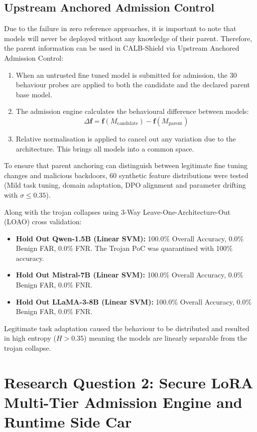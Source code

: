 \documentclass[conference]{IEEEtran}
\begin{document}
\subsection{Upstream Anchored Admission Control}
\label{subsec:rq1_upstream}
Due to the failure in zero reference approaches, it is important to note that models will never be deployed without any knowledge of their parent. Therefore, the parent information can be used in CALB-Shield via Upstream Anchored Admission Control:
\begin{enumerate}
    \item When an untrusted fine tuned model is submitted for admission, the 30 behaviour probes are applied to both the candidate and the declared parent base model.
    \item The admission engine calculates the behavioural difference between models:
    \begin{equation}
    \Delta \mathbf{f} = \mathbf{f}(M_{\text{candidate}}) - \mathbf{f}(M_{\text{parent}})
    \end{equation}
    \item Relative normalisation is applied to cancel out any variation due to the architecture. This brings all models into a common space.
\end{enumerate}

To ensure that parent anchoring can distinguish between legitimate fine tuning changes and malicious backdoors, 60 synthetic feature distributions were tested (Mild task tuning, domain adaptation, DPO alignment and parameter drifting with $\sigma \le 0.35$).

Along with the trojan collapses using 3-Way Leave-One-Architecture-Out (LOAO) cross validation:
\begin{itemize}
    \item \textbf{Hold Out Qwen-1.5B (Linear SVM):} 100.0\% Overall Accuracy, 0.0\% Benign FAR, 0.0\% FNR. The Trojan PoC was quarantined with 100\% accuracy.
    \item \textbf{Hold Out Mistral-7B (Linear SVM):} 100.0\% Overall Accuracy, 0.0\% Benign FAR, 0.0\% FNR.
    \item \textbf{Hold Out LLaMA-3-8B (Linear SVM):} 100.0\% Overall Accuracy, 0.0\% Benign FAR, 0.0\% FNR.
\end{itemize}
Legitimate task adaptation caused the behaviour to be distributed and resulted in high entropy ($H > 0.35$) meaning the models are linearly separable from the trojan collapse.
\section{Research Question 2: Secure LoRA Multi-Tier Admission Engine and Runtime Side Car}
\label{sec:method_rq2}
\end{document}
